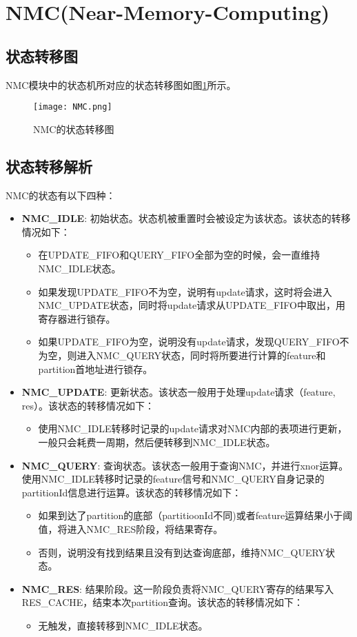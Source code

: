 \documentclass[lang=cn,11pt]{elegantpaper}
\begin{document}
\section{NMC(Near-Memory-Computing)}
\subsection{状态转移图}
NMC模块中的状态机所对应的状态转移图如图\ref{NMC}所示。
\begin{figure}[htbp]
	\centering
	\texttt{[image: NMC.png]}
	\caption{NMC的状态转移图}
	\label{NMC}
\end{figure}
\subsection{状态转移解析}
NMC的状态有以下四种：
\begin{itemize}
	\item \textbf{NMC\_IDLE}: 初始状态。状态机被重置时会被设定为该状态。该状态的转移情况如下：
	\begin{itemize}
		\item 在UPDATE\_FIFO和QUERY\_FIFO全部为空的时候，会一直维持NMC\_IDLE状态。
		\item 如果发现UPDATE\_FIFO不为空，说明有update请求，这时将会进入NMC\_UPDATE状态，同时将update请求从UPDATE\_FIFO中取出，用寄存器进行锁存。
		\item 如果UPDATE\_FIFO为空，说明没有update请求，发现QUERY\_FIFO不为空，则进入NMC\_QUERY状态，同时将所要进行计算的feature和partition首地址进行锁存。
	\end{itemize}
	\item \textbf{NMC\_UPDATE}: 更新状态。该状态一般用于处理update请求（feature, res）。该状态的转移情况如下：
	\begin{itemize}
		\item 使用NMC\_IDLE转移时记录的update请求对NMC内部的表项进行更新，一般只会耗费一周期，然后便转移到NMC\_IDLE状态。
	\end{itemize}
	\item \textbf{NMC\_QUERY}: 查询状态。该状态一般用于查询NMC，并进行xnor运算。使用NMC\_IDLE转移时记录的feature信号和NMC\_QUERY自身记录的partitionId信息进行运算。该状态的转移情况如下：
	\begin{itemize}
		\item 如果到达了partition的底部（partitioonId不同)或者feature运算结果小于阈值，将进入NMC\_RES阶段，将结果寄存。
		\item 否则，说明没有找到结果且没有到达查询底部，维持NMC\_QUERY状态。
	\end{itemize}
	\item \textbf{NMC\_RES}: 结果阶段。这一阶段负责将NMC\_QUERY寄存的结果写入RES\_CACHE，结束本次partition查询。该状态的转移情况如下：
	\begin{itemize}
		\item 无触发，直接转移到NMC\_IDLE状态。
	\end{itemize}
\end{itemize}



\end{document}
